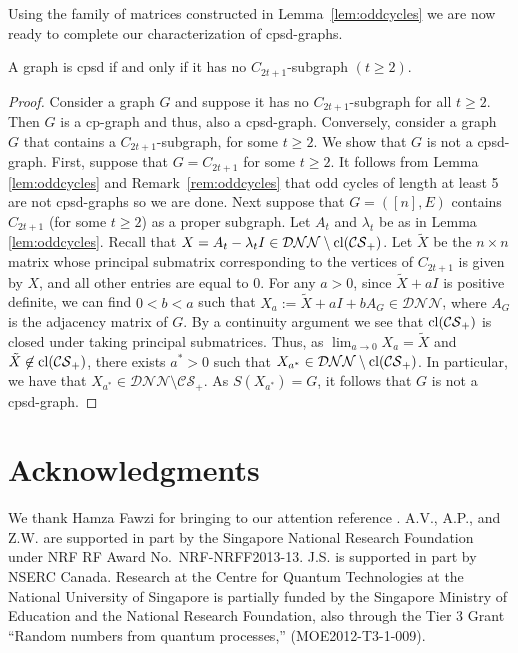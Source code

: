 \documentclass{siamart}
\begin{document}
Using the family of matrices constructed in Lemma~\ref{lem:oddcycles} we are   now  ready to complete  our characterization of cpsd-graphs.

\medskip
\begin{theorem}\label{thm:cpsdgraphs}
A graph is cpsd  if and only if  it has no $C_{2t+1}$-subgraph $(t\ge 2)$.
\end{theorem}
\medskip

\begin{proof}
Consider a graph $G$ and {suppose it} has no $C_{2t+1}$-subgraph  for all $t \ge2$. Then $G$ is a cp-graph and thus, also a cpsd-graph.  Conversely, consider a graph $G$ that contains a $C_{2t+1}$-subgraph, for some  $t\ge 2$. We  show that $G$ is not a cpsd-graph.  First, {suppose} that $G=C_{2t+1}$ for some $t\ge 2$. It follows from {Lemma \ref{lem:oddcycles} and} Remark~\ref{rem:oddcycles} that  odd cycles of length at least 5 are not {cpsd-graphs} so we are done. Next {suppose} that $G=([n],E)$ contains $C_{2t+1}$ (for some $t\ge 2$) as a  proper subgraph. {Let $A_t$ and $\lambda_t$ be as  in Lemma \ref{lem:oddcycles}. Recall that {$X=A_t-\lambda_t I \in {\mathcal{DNN}}\setminus {\rm cl}({\mathcal{CS}_+})$}}. Let $\tilde{X}$ be the $n\times n$ matrix {whose principal submatrix corresponding to the vertices of $C_{2t+1}$  is given by $X$}, and all other entries are equal to $0$.
 For any $a>0$, since $\tilde{X}+aI$ is positive definite, we can find $0<b<a$ such that $X_a:=\tilde{X}+aI+bA_G\in {\mathcal{DNN}}$, {where $A_G$ is the adjacency
matrix of $G$}. 
{By a continuity argument we see  that ${\rm cl}({\mathcal{CS}_+})$ is closed under taking principal
submatrices}.  {Thus}, as  $\lim_{a\rightarrow 0}X_a=\tilde{X}$ and
$\tilde{X}\not \in {\rm cl}({\mathcal{CS}_+})$, there exists  $a^*>0$ such that
$X_{a^*}\in {\mathcal{DNN}}\setminus  {\rm cl}({\mathcal{CS}_+})$.  In particular, we have
that $ X_{a^*}\in {\mathcal{DNN}}\setminus  {\mathcal{CS}_+}$. As $S(X_{a^*})=G$, it
follows that  $G$ is not a cpsd-graph. 
\end{proof}

\section*{Acknowledgments}

{We} thank Hamza Fawzi for bringing to our attention  reference  \cite{FW}.
A.V., A.P., and Z.W. are supported in part by the
Singapore National Research Foundation under NRF RF Award
No.~NRF-NRFF2013-13. {J.S. is supported in part by NSERC Canada. Research at the Centre for Quantum Technologies at the National University of Singapore is partially funded by the Singapore Ministry of Education
and the National Research Foundation, also through the Tier 3 Grant ``Random numbers from
quantum processes,'' (MOE2012-T3-1-009).}
\end{document}
